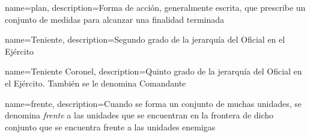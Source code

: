  {
  name={plan},
  description={Forma de acción, generalmente escrita, que prescribe
               un conjunto de medidas para alcanzar una finalidad terminada}
}

 {
  name={Teniente},
  description={Segundo grado de la jerarquía del Oficial en el Ejército}
}

 {
  name={Teniente Coronel},
  description={Quinto grado de la jerarquía del Oficial en el Ejército.
               También se le denomina Comandante}
}

 {
  name={frente},
  description={Cuando se forma un conjunto de muchas unidades,
               se denomina \emph{frente} a las unidades que se encuentran
               en la frontera de dicho conjunto que se encuentra frente
               a las unidades enemigas}
}

